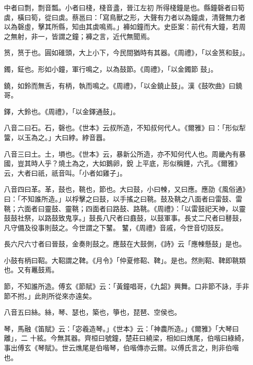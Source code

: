 \begin{pinyinscope}
 中者曰剽，剽音瓢。小者曰棧，棧音盞，晉江左初
 所得棧鐘是也。縣鐘磬者曰筍虡，橫曰筍，從曰虡。蔡邕曰：「寫鳥獸之形，大聲有力者以為鐘虡，清聲無力者以為磬虛，擊其所縣，知由其虡鳴焉。」褲如鐘而大。史臣案：前代有大鐘，若周之無射，非一，皆謂之鐘；褲之言，近代無聞焉。



 筼，筼于也。圓如碓頭，大上小下，今民間猶時有其器。《周禮》，「以金筼和鼓」。



 鐲，鉦也。形如小鐘，軍行鳴之，以為鼓節。《周禮》，「以金鐲節
 鼓」。



 鐃，如鈴而無舌，有柄，執而鳴之。《周禮》，「以金鐃止鼓」。漢《鼓吹曲》曰鐃哥。



 鐸，大鈴也。《周禮》，「以金鐸通鼓」。



 八音二曰石。石，磬也。《世本》云叔所造，不知叔何代人。《爾雅》曰：「形似犁簹，以玉為之。」大曰綍。綍音囂。



 八音三曰土。土，塤也。《世本》云，暴新公所造，亦不知何代人也。周畿內有暴國，豈其時人乎？燒土為之，大如鵝卵，銳
 上平底，形似稱錘，六孔。《爾雅》云，大者曰祇，祇音叫。「小者如雞子」。



 八音四曰革。革，鼓也，鞉也，節也。大曰鼓，小曰朄，又曰應。應劭《風俗通》曰：「不知誰所造。」以桴擊之曰鼓，以手搖之曰鞉。鼓及鞉之八面者曰雷鼓、雷鞉；六面者曰靈鼓、靈鞉；四面者曰路鼓、路鞉。《周禮》：「以雷鼓祀天神，以靈鼓鼓社祭，以路鼓致鬼享。」鼓長八尺者曰鼖鼓，以鼓軍事。長丈二尺者曰鼛鼓，凡守備及役事則鼓之。今世謂之下鼜。
 鼜，《周禮》音戚，今世音切豉反。



 長六尺六寸者曰晉鼓，金奏則鼓之。應鼓在大鼓側，《詩》云「應朄懸鼓」是也。



 小鼓有柄曰鞀。大鞀謂之鞞。《月令》「仲夏修鞀、鞞」。是也。然則鞀、鞞即鞉類也。又有鼉鼓焉。



 節，不知誰所造。傅玄《節賦》云：「黃鐘唱哥，《九韶》興舞。口非節不詠，手非節不拊。」此則所從來亦遠矣。



 八音五曰絲。絲，琴、瑟也，築也，箏也，琵琶、空侯也。



 琴，馬融《笛賦》云：「宓羲造琴。」《世本》云：「神農所造。」《爾雅》「大琴曰離」，二
 十絃。今無其器。齊桓曰號鐘，楚莊曰繞梁，相如曰燋尾，伯喈曰綠綺，事出傅玄《琴賦》。世云燋尾是伯喈琴，伯喈傳亦云爾。以傅氏言之，則非伯喈也。




\end{pinyinscope}
